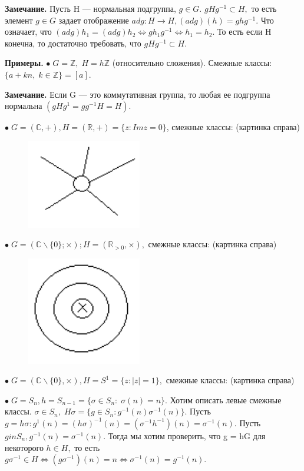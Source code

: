 \documentclass[12pt,a4paper]{article}
\begin{document}
\textbf{Замечание.} Пусть H --- нормальная подгруппа, $g \in G.$ $gHg^{-1} \subset H,$ то есть элемент $g \in G$ задает отображение $adg: H \to H, (adg)(h) = ghg^{-1}.$ Что означает, что $(adg)h_{1} = (adg)h_{2} \Leftrightarrow gh_{1}g^{-1} \Leftrightarrow h_{1} = h_{2}.$ То есть если H конечна, то достаточно требовать, что $gHg^{-1} \subset H.$ 

\textbf{Примеры.} $\bullet \; G = \mathbb{Z}, \; H = h\mathbb{Z}$ (относительно сложения). Смежные классы: $\{a + kn, \; k \in \mathbb{Z}\} = [a].$

\textbf{Замечание.} Если G --- это коммутативная группа, то любая ее подгруппа нормальна $(gHg^{1} = gg^{-1}H = H).$

$\bullet \; G = (\mathbb{C}, +), H = (\mathbb{R}, +) = \{z: Im z = 0\}$, смежные классы: (картинка справа)

\begin{figure}
	\includegraphics[width = 5cm]{5_11_2.png}
\end{figure}

$\bullet \; G = (\mathbb{C}\backslash\{0\}; \times); H = (\mathbb{R}_{> 0}, \times),$ смежные классы: (картинка справа)

\begin{figure}
	\includegraphics[width = 5cm]{5_11_3.png}
\end{figure}

$\bullet \; G = (\mathbb{C}\backslash\{0\}, \times), H = S^{1} = \{z: |z| = 1\},$ смежные классы: (картинка справа)

$\bullet \; G = S_{n}, h = S_{n - 1} = \{\sigma \in S_{n}: \; \sigma(n) = n\}.$ Хотим описать левые смежные классы. $\sigma \in S_{n}, \; H\sigma = \{g \in S_{n}: g^{-1}(n) \sigma^{-1}(n)\}.$ Пусть $g = h\sigma: g^{1}(n) = (h\sigma)^{-1}(n) = (\sigma^{-1}h^{-1})(n) = \sigma^{-1}(n).$ Пусть $g in S_{n}, g^{-1}(n) = \sigma^{-1}(n).$ Тогда мы хотим проверить, что g = hG для некоторого $h \in H,$ то есть $g\sigma^{-1} \in H \Leftrightarrow (g\sigma^{-1})(n) = n \Leftrightarrow \sigma^{-1}(n) = g^{-1}(n).$ 
\end{document}
